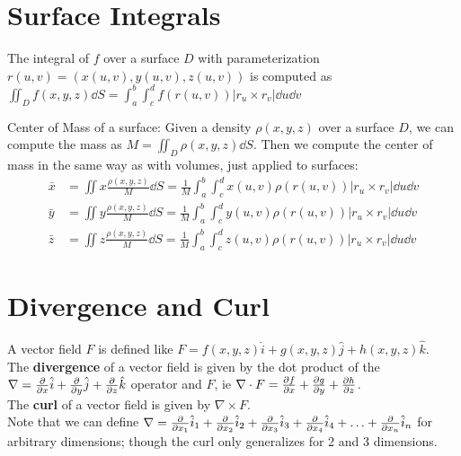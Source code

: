 \documentclass[letterpaper,11pt]{article}
\begin{document}
\section*{Surface Integrals}
The integral of $f$ over a surface $D$ with parameterization $r(u, v) = (x(u, v), y(u, v), z(u, v))$ is computed as
$\iint_D f(x, y, z) \dd{S} = \int_a^b \int_c^d f(r(u, v)) |r_u \times r_v| \dd{u} \dd{v}$

Center of Mass of a surface: Given a density $\rho(x, y, z)$ over a surface $D$, we can compute the mass as
$M = \iint_D \rho(x, y, z) \dd{S}$.
Then we compute the center of mass in the same way as with volumes, just applied to surfaces:
\begin{align*}
  \bar{x} &= \iint x \frac{\rho(x, y, z)}{M} \dd{S} = \frac{1}{M} \int_a^b \int_c^d x(u, v) \rho(r(u, v)) |r_u \times r_v| \dd{u} \dd{v}\\
  \bar{y} &= \iint y \frac{\rho(x, y, z)}{M} \dd{S} = \frac{1}{M} \int_a^b \int_c^d y(u, v) \rho(r(u, v)) |r_u \times r_v| \dd{u} \dd{v}\\
  \bar{z} &= \iint z \frac{\rho(x, y, z)}{M} \dd{S} = \frac{1}{M} \int_a^b \int_c^d z(u, v) \rho(r(u, v)) |r_u \times r_v| \dd{u} \dd{v}
\end{align*}
\section*{Divergence and Curl}
A vector field $F$ is defined like $F = f(x, y, z) \hat{i} + g(x, y, z) \hat{j} + h(x, y, z) \hat{k}$.\\
The {\bf divergence} of a vector field is given by the dot product of the
$\nabla = \frac{\partial }{\partial x} \hat{i} + \frac{\partial }{\partial y} \hat{j} + \frac{\partial }{\partial z} \hat{k}$ operator and $F$, ie
$\nabla \cdot F = \frac{\partial f}{\partial x} + \frac{\partial g}{\partial y} + \frac{\partial h}{\partial z}$.\\
The {\bf curl} of a vector field is given by $\nabla \times F$.\\
Note that we can define $\nabla = \frac{\partial }{\partial x_1} \hat{i}_1 + \frac{\partial }{\partial x_2} \hat{i}_2 + \frac{\partial }{\partial x_3} \hat{i}_3 + \frac{\partial }{\partial x_4} \hat{i}_4 + \ldots + \frac{\partial }{\partial x_n} \hat{i}_n$
for arbitrary dimensions; though the curl only generalizes for 2 and 3 dimensions.
\end{document}
